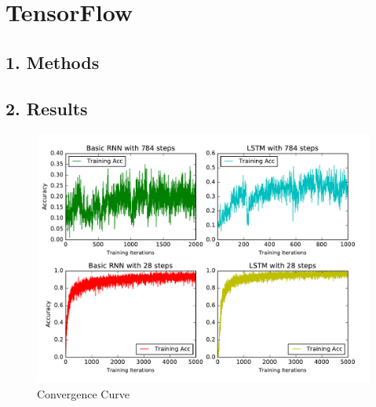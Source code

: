 

\usepackage{graphicx, amssymb, amsmath, listings, float, mathtools}
\usepackage{color, url}
\lstset{language = Python}
\lstset{breaklines}
\lstset{extendedchars=false}

\oddsidemargin 0in
\evensidemargin 0in
\textwidth 6.5in
\topmargin -0.6in
\textheight 9.0in




\section*{\Large TensorFlow}

\subsection*{\large 1. Methods}


\subsection*{\large 2. Results}

\begin{figure}[H]
\centering
\includegraphics[width=1.0\textwidth]{./figures/convergence.pdf}
\caption{\label{fig:curve} Convergence Curve}
\end{figure}

\clearpage

%
%
%




